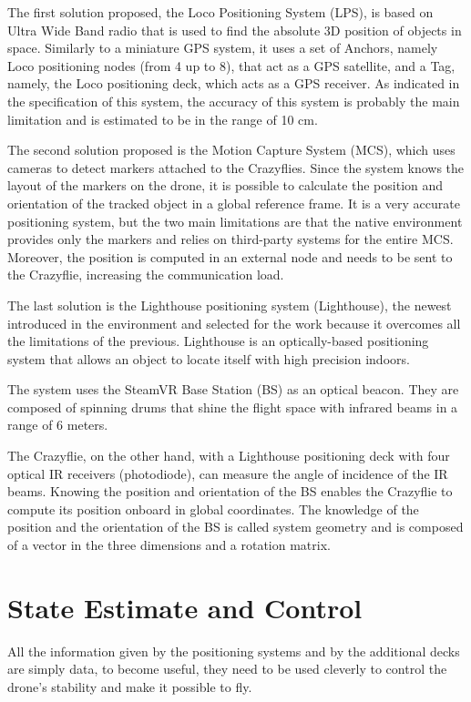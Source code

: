 The first solution proposed, the Loco Positioning System (LPS), is based on Ultra Wide Band radio that is used to find the absolute 3D position of objects in space. 
Similarly to a miniature GPS system, it uses a set of Anchors, namely Loco positioning nodes (from 4 up to 8), that act as a GPS satellite, and a Tag, 
namely, the Loco positioning deck, which acts as a GPS receiver. 
As indicated in the specification of this system, the accuracy of this system is probably the main limitation and is estimated to be in the range of 10 cm. 

The second solution proposed is the Motion Capture System (MCS), which uses cameras to detect markers attached to the Crazyflies. 
Since the system knows the layout of the markers on the drone, it is possible to calculate the position and orientation of the tracked object in a global reference frame. 
It is a very accurate positioning system, but the two main limitations are that the native environment provides only the markers and relies on third-party systems for the entire MCS. 
Moreover, the position is computed in an external node and needs to be sent to the Crazyflie, increasing the communication load.

The last solution is the Lighthouse positioning system (Lighthouse), the newest introduced in the environment and selected for the work because it overcomes all the limitations of the previous.
Lighthouse is an optically-based positioning system that allows an object to locate itself with high precision indoors. 

The system uses the SteamVR Base Station (BS) as an optical beacon. 
They are composed of spinning drums that shine the flight space with infrared beams in a range of 6 meters. 

The Crazyflie, on the other hand, with a Lighthouse positioning deck with four optical IR receivers (photodiode), can measure the angle of incidence of the IR beams. 
Knowing the position and orientation of the BS enables the Crazyflie to compute its position onboard in global coordinates. 
The knowledge of the position and the orientation of the BS is called system geometry and is composed of a vector in the three dimensions and a rotation matrix. 



\section{State Estimate and Control}\label{sec:state_estimate_and_control}
All the information given by the positioning systems and by the additional decks are simply data,
to become useful, they need to be used cleverly to control the drone's stability and make it possible to fly. 

